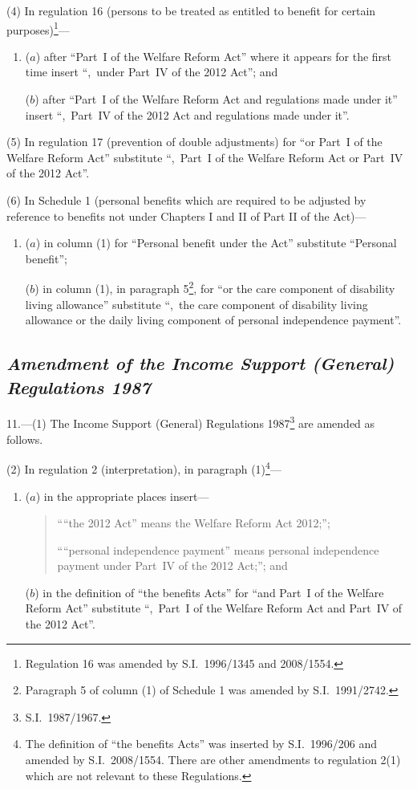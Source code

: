 \documentclass[12pt,a4paper]{article}
\begin{document}
(4) In regulation 16 (persons to be treated as entitled to benefit for certain purposes)\footnote{Regulation 16 was amended by S.I.~1996/1345 and 2008/1554.}—
\begin{enumerate}\item[]
($a$) after “Part~I of the Welfare Reform Act” where it appears for the first time insert “,~under Part~IV of the 2012 Act”; and

($b$) after “Part~I of the Welfare Reform Act and regulations made under it” insert “,~Part~IV of the 2012 Act and regulations made under it”.
\end{enumerate}

(5) In regulation 17 (prevention of double adjustments) for “or Part~I of the Welfare Reform Act” substitute “,~Part~I of the Welfare Reform Act or Part~IV of the 2012 Act”.

(6) In Schedule 1 (personal benefits which are required to be adjusted by reference to benefits not under Chapters I and II of Part II of the Act)—
\begin{enumerate}\item[]
($a$) in column (1) for “Personal benefit under the Act” substitute “Personal benefit”;

($b$) in column (1), in paragraph 5\footnote{Paragraph 5 of column (1) of Schedule 1 was amended by S.I.~1991/2742.}, for “or the care component of disability living allowance” substitute “,~the care component of disability living allowance or the daily living component of personal independence payment”.
\end{enumerate}

\subsection*{\itshape Amendment of the Income Support (General) Regulations 1987}

11.—(1) The Income Support (General) Regulations 1987\footnote{S.I.~1987/1967.} are amended as follows.

(2) In regulation 2 (interpretation), in paragraph (1)\footnote{The definition of “the benefits Acts” was inserted by S.I.~1996/206 and amended by S.I.~2008/1554. There are other amendments to regulation 2(1) which are not relevant to these Regulations.}—
\begin{enumerate}\item[]
($a$) in the appropriate places insert—
\begin{quotation}
““the 2012 Act” means the Welfare Reform Act 2012;”;

““personal independence payment” means personal independence payment under Part~IV of the 2012 Act;”; and
\end{quotation}

($b$) in the definition of “the benefits Acts” for “and Part~I of the Welfare Reform Act” substitute “,~Part~I of the Welfare Reform Act and Part~IV of the 2012 Act”.
\end{enumerate}
\end{document}
